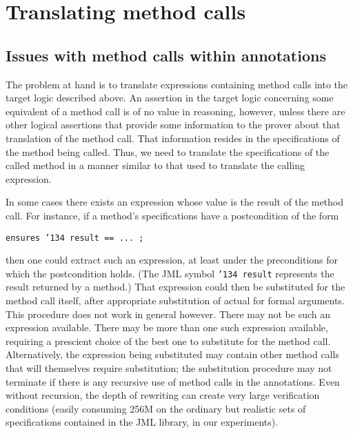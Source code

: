 \documentclass{sig-alternate}
\begin{document}
\section{Translating method calls}

\subsection{Issues with method calls within annotations}

The problem at hand is to translate expressions containing method calls into the target logic described above.  An assertion in the target logic concerning some equivalent of a method call is of no value in reasoning, however, unless there are other logical assertions that provide some 
information to the prover about that translation of the method call.  That information resides in
the specifications of the method being called.  Thus, we need to translate the specifications
of the called method
in a manner similar to that used to translate the calling expression.

In some cases there exists an expression whose value is the result of the method call.  For
instance, if a method's specifications have a postcondition of the form
\begin{center}\texttt{ensures \char'134 result == ... ; }\end{center}
then one could extract such an expression, at least under the preconditions for which the
postcondition holds.  (The JML symbol \texttt{\char'134 result} represents the result returned by a method.)  
That expression could then be substituted for the method call itself,
after appropriate substitution of actual for formal arguments.  This procedure does not work
in general however.  There may not be such an expression available.  There may be more than
one such
expression available, requiring a prescient choice of the best one to substitute for the method call.
Alternatively, the expression being substituted may contain other method calls that
will themselves require substitution; the substitution procedure may not terminate if there is
any recursive use of method calls in the annotations.  Even without recursion, the depth of
rewriting can create very large verification conditions (easily consuming 256M on the ordinary
but realistic sets of specifications contained in the JML library, in our experiments).
\end{document}
